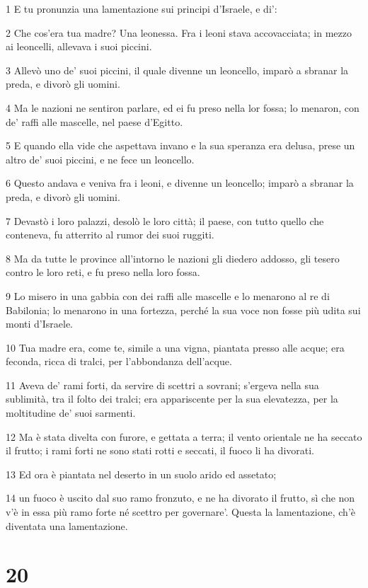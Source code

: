 \par 1 E tu pronunzia una lamentazione sui principi d'Israele, e di':
\par 2 Che cos'era tua madre? Una leonessa. Fra i leoni stava accovacciata; in mezzo ai leoncelli, allevava i suoi piccini.
\par 3 Allevò uno de' suoi piccini, il quale divenne un leoncello, imparò a sbranar la preda, e divorò gli uomini.
\par 4 Ma le nazioni ne sentiron parlare, ed ei fu preso nella lor fossa; lo menaron, con de' raffi alle mascelle, nel paese d'Egitto.
\par 5 E quando ella vide che aspettava invano e la sua speranza era delusa, prese un altro de' suoi piccini, e ne fece un leoncello.
\par 6 Questo andava e veniva fra i leoni, e divenne un leoncello; imparò a sbranar la preda, e divorò gli uomini.
\par 7 Devastò i loro palazzi, desolò le loro città; il paese, con tutto quello che conteneva, fu atterrito al rumor dei suoi ruggiti.
\par 8 Ma da tutte le province all'intorno le nazioni gli diedero addosso, gli tesero contro le loro reti, e fu preso nella loro fossa.
\par 9 Lo misero in una gabbia con dei raffi alle mascelle e lo menarono al re di Babilonia; lo menarono in una fortezza, perché la sua voce non fosse più udita sui monti d'Israele.
\par 10 Tua madre era, come te, simile a una vigna, piantata presso alle acque; era feconda, ricca di tralci, per l'abbondanza dell'acque.
\par 11 Aveva de' rami forti, da servire di scettri a sovrani; s'ergeva nella sua sublimità, tra il folto dei tralci; era appariscente per la sua elevatezza, per la moltitudine de' suoi sarmenti.
\par 12 Ma è stata divelta con furore, e gettata a terra; il vento orientale ne ha seccato il frutto; i rami forti ne sono stati rotti e seccati, il fuoco li ha divorati.
\par 13 Ed ora è piantata nel deserto in un suolo arido ed assetato;
\par 14 un fuoco è uscito dal suo ramo fronzuto, e ne ha divorato il frutto, sì che non v'è in essa più ramo forte né scettro per governare'. Questa la lamentazione, ch'è diventata una lamentazione.

\chapter{20}

